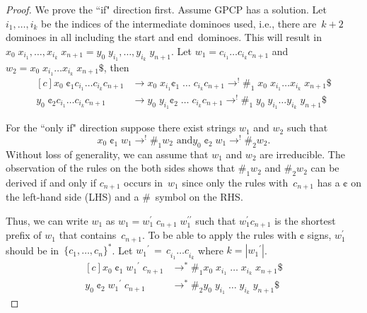 \documentclass{lmcs} %
\theoremstyle{plain}\newtheorem{satz}[thm]{Satz} %
\begin{document}
\begin{appendices}
\begin{proof}
We prove the ``if" direction first. Assume GPCP has a solution. 
Let $i_1, \ldots, i_k$ be the indices of the intermediate dominoes used, i.e., there are~$k+2$ dominoes 
in all
including the start and end~dominoes. This will result in
$x_0\;x_{i_1}, \ldots, x_{i_k}\; x_{n+1} =
y_0\;y_{i_1}, \ldots, y_{i_k}\; y_{n+1}$.
Let
$w_1 = c_{i_1} \ldots c_{i_k} c_{n+1}^{}$ and $w_2 = x_0\;x_{i_1} \ldots x_{i_k}\;x_{n+1} \$$, then
\begin{equation*}
\begin{aligned}[c]
x_0\; \cent_1 c_{i_1} \ldots c_{i_k} c_{n+1} & \rightarrow x_0\; x_{i_1} \cent_1 \; \ldots \; c_{i_k} c_{n+1} \rightarrow^{!} \#_1 \;x_0\;x_{i_1} \ldots x_{i_k}\;x_{n+1} \$\\
y_0\; \cent_2 c_{i_1} \ldots c_{i_k} c_{n+1} & \rightarrow y_0\; y_{i_1} \cent_2 \; \ldots \; c_{i_k} c_{n+1} \rightarrow^{!} \#_1 \;y_0\;y_{i_1} \ldots y_{i_k}\;y_{n+1} \$
\end{aligned}
\end{equation*}

For the ``only if" direction suppose there exist strings
$w_1$ and $w_2$ such that $$x_0\; \cent_1\; w_1 \rightarrow^{!} \#_1 w_2 \text{ and}
y_0\; \cent_2\; w_1 \rightarrow^{!} \#_2 w_2.$$
Without loss of generality, we can assume that $w_1$ and $w_2$ are irreducible.
The observation of the rules on the both sides shows that $\#_1 w_2$ and $ \#_2 w_2$ can be derived
if and only if $c_{n+1}$ occurs in~$w_1$ since only the rules with~$c_{n+1}$
has a $\cent$ on the left-hand side (LHS) and a
$\#$~symbol on the RHS.

Thus, we can write $w_1$ as $w_1 = {w_1^{\prime}} \; c_{n+1}\;
{w_1^{\prime\prime}}$ such that ${w_1^{\prime}} c_{n+1}$ is the shortest
prefix of $w_1$ that contains~$c_{n+1}$.  To be able to apply the
rules with $\cent$ signs, ${w_1^{\prime}}$ should be in~$\{c_1,
\ldots, c_n\}_{}^{*}$. Let
${w_1}^{\prime} \, = \, c_{i_1}^{} \ldots c_{i_k}^{}$ where $k = | {w_1}^{\prime} |$.
\begin{equation*}
\begin{aligned}[c]
x_0\;\cent_1\; {w_1}^{\prime}\;c_{n+1} & \rightarrow_{}^* \#_1 x_{0}\;x_{i_1}\; \ldots \;x_{i_k}\;x_{n+1} \$ \\
y_0\;\cent_2\; {w_1}^{\prime}\;c_{n+1} & \rightarrow_{}^* \#_2 y_{0}\;y_{i_1}\; \ldots \;y_{i_k}\;y_{n+1} \$
\end{aligned}
\end{equation*}


\end{proof}
\end{appendices}
\end{document}
